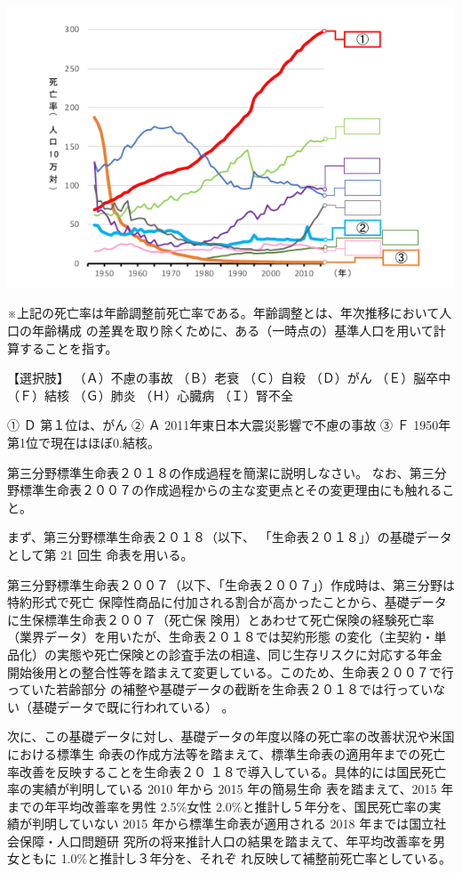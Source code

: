 \documentclass[report,gutter=10mm,fore-edge=10mm,uplatex,dvipdfmx]{jlreq}
\begin{document}
       \includegraphics[scale=1]{images/Prob2022-1-1-6-a.png}


※上記の死亡率は年齢調整前死亡率である。年齢調整とは、年次推移において人口の年齢構成
の差異を取り除くために、ある（一時点の）基準人口を用いて計算することを指す。

【選択肢】
（Ａ）不慮の事故 （Ｂ）老衰 （Ｃ）自殺
（Ｄ）がん （Ｅ）脳卒中 （Ｆ）結核
（Ｇ）肺炎 （Ｈ）心臓病 （Ｉ）腎不全

① Ｄ 
第１位は、がん
② Ａ 
2011年東日本大震災影響で不慮の事故
③ Ｆ
1950年第1位で現在はほぼ0.結核。


第三分野標準生命表２０１８の作成過程を簡潔に説明しなさい。
なお、第三分野標準生命表２００７の作成過程からの主な変更点とその変更理由にも触れること。

まず、第三分野標準生命表２０１８（以下、
「生命表２０１８」）の基礎データとして第 21 回生
命表を用いる。

第三分野標準生命表２００７（以下、「生命表２００７」）作成時は、第三分野は特約形式で死亡
保障性商品に付加される割合が高かったことから、基礎データに生保標準生命表２００７（死亡保
険用）とあわせて死亡保険の経験死亡率（業界データ）を用いたが、生命表２０１８では契約形態
の変化（主契約・単品化）の実態や死亡保険との診査手法の相違、同じ生存リスクに対応する年金
開始後用との整合性等を踏まえて変更している。このため、生命表２００７で行っていた若齢部分
の補整や基礎データの截断を生命表２０１８では行っていない（基礎データで既に行われている）
。

次に、この基礎データに対し、基礎データの年度以降の死亡率の改善状況や米国における標準生
命表の作成方法等を踏まえて、標準生命表の適用年までの死亡率改善を反映することを生命表２０
１８で導入している。具体的には国民死亡率の実績が判明している 2010 年から 2015 年の簡易生命
表を踏まえて、2015 年までの年平均改善率を男性 2.5\%女性 2.0\%と推計し５年分を、国民死亡率の実
績が判明していない 2015 年から標準生命表が適用される 2018 年までは国立社会保障・人口問題研
究所の将来推計人口の結果を踏まえて、年平均改善率を男女ともに 1.0\%と推計し３年分を、それぞ
れ反映して補整前死亡率としている。
\end{document}
